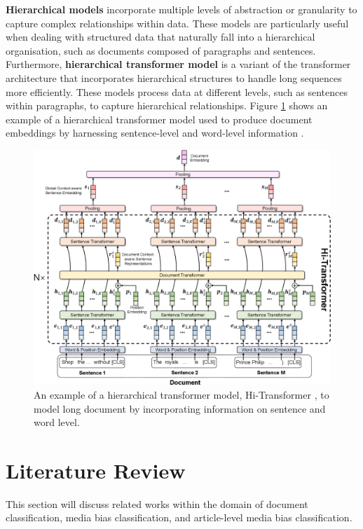 \textbf{Hierarchical models} \cite{sun-2020-fine-tune} incorporate multiple levels of abstraction or granularity to capture complex relationships within data. These models are particularly useful when dealing with structured data that naturally fall into a hierarchical organisation, such as documents composed of paragraphs and sentences. Furthermore, \textbf{hierarchical transformer model} is a variant of the transformer architecture that incorporates hierarchical structures to handle long sequences more efficiently. These models process data at different levels, such as sentences within paragraphs, to capture hierarchical relationships. Figure \ref{fig:hi_transformer} shows an example of a hierarchical transformer model used to produce document embeddings by harnessing sentence-level and word-level information \cite{wu-2021-hi-transformer}.



\begin{figure}[htbp]
    \centering
    \includegraphics[width=0.9\linewidth]{images/hi_transformer.png}
    \caption{An example of a hierarchical transformer model, Hi-Transformer \cite{wu-2021-hi-transformer}, to model long document by incorporating information on sentence and word level.}
    \label{fig:hi_transformer}
\end{figure}


\section{Literature Review}

This section will discuss related works within the domain of document classification, media bias classification, and article-level media bias classification.


